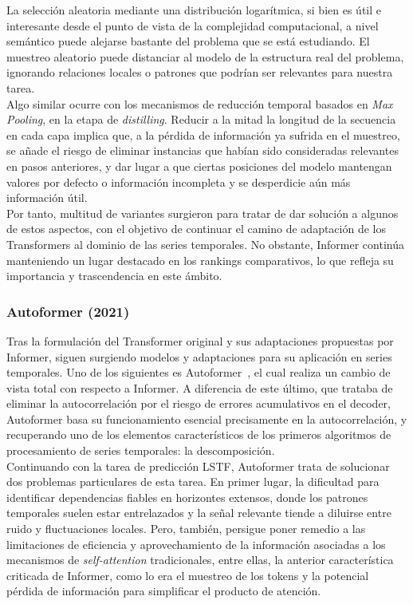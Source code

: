 La selección aleatoria mediante una distribución logarítmica, si bien es útil e interesante desde el punto de vista de la complejidad computacional, a nivel semántico puede alejarse bastante del problema que se está estudiando. El muestreo aleatorio puede distanciar al modelo de la estructura real del problema, ignorando relaciones locales o patrones que podrían ser relevantes para nuestra tarea.\\

Algo similar ocurre con los mecanismos de reducción temporal basados en \textit{Max Pooling}, en la etapa de \textit{distilling}. Reducir a la mitad la longitud de la secuencia en cada capa implica que, a la pérdida de información ya sufrida en el muestreo, se añade el riesgo de eliminar instancias que habían sido consideradas relevantes en pasos anteriores, y dar lugar a que ciertas posiciones del modelo mantengan valores por defecto o información incompleta y se desperdicie aún más información útil.\\

Por tanto, multitud de variantes surgieron para tratar de dar solución a algunos de estos aspectos, con el objetivo de continuar el camino de adaptación de los Transformers al dominio de las series temporales. No obstante, Informer continúa manteniendo un lugar destacado en los rankings comparativos, lo que refleja su importancia y trascendencia en este ámbito.

\subsubsection{Autoformer (2021)}

Tras la formulación del Transformer original y sus adaptaciones propuestas por Informer, siguen surgiendo modelos y adaptaciones para su aplicación en series temporales. Uno de los siguientes es Autoformer~\cite{wu2022autoformerdecompositiontransformersautocorrelation}, el cual realiza un cambio de vista total con respecto a Informer. A diferencia de este último, que trataba de eliminar la autocorrelación por el riesgo de errores acumulativos en el decoder, Autoformer basa su funcionamiento esencial precisamente en la autocorrelación, y recuperando uno de los elementos característicos de los primeros algoritmos de procesamiento de series temporales: la descomposición.\\

Continuando con la tarea de predicción LSTF, Autoformer trata de solucionar dos problemas particulares de esta tarea. En primer lugar, la dificultad para identificar dependencias fiables en horizontes extensos, donde los patrones temporales suelen estar entrelazados y la señal relevante tiende a diluirse entre ruido y fluctuaciones locales. Pero, también, persigue poner remedio a las limitaciones de eficiencia y aprovechamiento de la información asociadas a los mecanismos de \textit{self-attention} tradicionales, entre ellas, la anterior característica criticada de Informer, como lo era el muestreo de los tokens y la potencial pérdida de información para simplificar el producto de atención.\\

